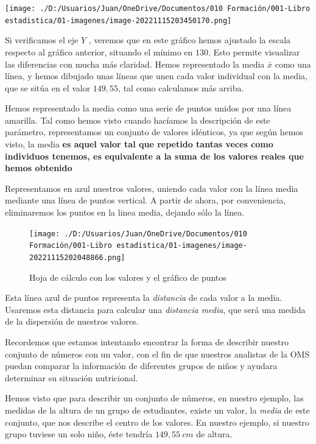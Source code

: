 \documentclass[
  letterpaper,
]{scrbook}
\begin{document}
\texttt{[image: ./D:/Usuarios/Juan/OneDrive/Documentos/010 Formación/001-Libro estadistica/01-imagenes/image-20221115203450170.png]}

Si verificamos el eje \(Y\) , veremos que en este gráfico hemos ajustado
la escala respecto al gráfico anterior, situando el mínimo en \(130\).
Esto permite visualizar las diferencias con mucha más claridad. Hemos
representado la media \(\bar{x}\) como una línea, y hemos dibujado unas
líneas que unen cada valor individual con la media, que se sitúa en el
valor \(149,55\), tal como calculamos más arriba.

Hemos representado la media como una serie de puntos unidos por una
línea amarilla. Tal como hemos visto cuando hacíamos la descripción de
este parámetro, representamos un conjunto de valores idénticos, ya que
según hemos visto, la media \textbf{es aquel valor tal que repetido
tantas veces como individuos tenemos, es equivalente a la suma de los
valores reales que hemos obtenido}

Representamos en azul nuestros valores, uniendo cada valor con la línea
media mediante una línea de puntos vertical. A partir de ahora, por
conveniencia, eliminaremos los puntos en la linea media, dejando sólo la
línea.

\begin{figure}

{\centering \texttt{[image: ./D:/Usuarios/Juan/OneDrive/Documentos/010 Formación/001-Libro estadistica/01-imagenes/image-20221115202048866.png]}

}

\caption{Hoja de cálculo con los valores y el gráfico de puntos}

\end{figure}

Esta línea azul de puntos representa la \emph{distancia} de cada valor a
la media. Usaremos esta distancia para calcular una \emph{distancia
media}, que será una medida de la dispersión de nuestros valores.

Recordemos que estamos intentando encontrar la forma de describir
nuestro conjunto de números con un valor, con el fin de que nuestros
analistas de la OMS puedan comparar la información de diferentes grupos
de niños y ayudara determinar su situación nutricional.

Hemos visto que para describir un conjunto de números, en nuestro
ejemplo, las medidas de la altura de un grupo de estudiantes, existe un
valor, la \emph{media} de este conjunto, que nos describe el centro de
los valores. En nuestro ejemplo, si nuestro grupo tuviese un solo niño,
éste tendría \(149,55{\ }cm\) de altura.
\end{document}
